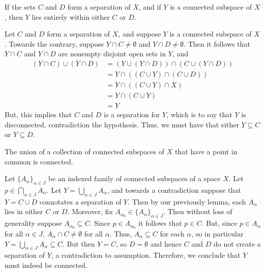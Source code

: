 \documentclass[12pt, a4paper, twoside, openright, titlepage]{book}
\begin{document}
\begin{lem}{}{}
    If the sets $C$ and $D$ form a separation of $X$, and if $Y$ is a connected subspace of $X$, then $Y$ lies entirely within either $C$ or $D$.
\end{lem}
\begin{proof*}{}{}
    Let $C$ and $D$ form a separation of $X$, and suppose $Y$ is a connected subspace of $X$. Towards the contrary, suppose $Y\cap C \neq \emptyset$ and $Y\cap D \neq \emptyset$. Then it follows that $Y\cap C$ and $Y\cap D$ are nonempty disjoint open sets in $Y$, and \begin{align*}
        (Y\cap C)\cup (Y\cap D) &= (Y\cup(Y\cap D))\cap (C\cup(Y\cap D)) \\
        &= Y\cap ((C\cup Y)\cap (C\cup D)) \\
        &= Y\cap ((C\cup Y)\cap X) \\
        &= Y\cap (C\cup Y) \\
        &= Y
    \end{align*}
    But, this implies that $C$ and $D$ is a separation for $Y$, which is to say that $Y$ is disconnected, contradiction the hypothesis. Thus, we must have that either $Y\subseteq C$ or $Y\subseteq D$.
\end{proof*}


\begin{thm}{}{}
    The union of a collection of connected subspaces of $X$ that have a point in common is connected.
\end{thm}
\begin{proof*}{}{}
    Let $\{A_{\alpha}\}_{\alpha \in J}$ be an indexed family of connected subspaces of a space $X$. Let $p \in \bigcap_{\alpha \in J}A_{\alpha}$. Let $Y = \bigcup_{\alpha \in J}A_{\alpha}$, and towards a contradiction suppose that $Y = C\cup D$ connotates a separation of $Y$. Then by our previously lemma, each $A_{\alpha}$ lies in either $C$ or $D$. Moreover, fix $A_{\alpha_0} \in \{A_{\alpha}\}_{\alpha \in J}$. Then without loss of generality suppose $A_{\alpha_0} \subseteq C$. Since $p \in A_{\alpha_0}$ it follows that $p \in C$. But, since $p \in A_{\alpha}$ for all $\alpha \in J$, $A_{\alpha} \cap C \neq \emptyset$ for all $\alpha$. Thus, $A_{\alpha} \subseteq C$ for each $\alpha$, so in particular $Y = \bigcup_{\alpha \in J}A_{\alpha} \subseteq C$. But then $Y = C$, so $D = \emptyset$ and hence $C$ and $D$ do not create a separation of $Y$, a contradiction to assumption. Therefore, we conclude that $Y$ must indeed be connected.
\end{proof*}
\end{document}
